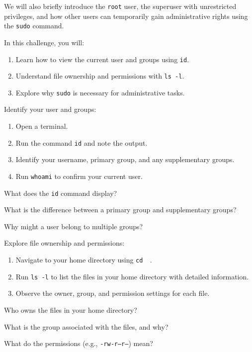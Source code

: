 \begin{challenge}
\begin{chadescription}
        We will also briefly introduce the \texttt{root} user, the superuser with unrestricted privileges, and how other users can temporarily gain administrative rights using the \texttt{sudo} command.

        In this challenge, you will:
        \begin{enumerate}
            \item Learn how to view the current user and groups using \texttt{id}.
            \item Understand file ownership and permissions with \texttt{ls -l}.
            \item Explore why \texttt{sudo} is necessary for administrative tasks.
        \end{enumerate}
    \end{chadescription}

    \begin{task}
    Identify your user and groups:
    \begin{enumerate}
        \item Open a terminal.
        \item Run the command \texttt{id} and note the output.
        \item Identify your username, primary group, and any supplementary groups.
        \item Run \texttt{whoami} to confirm your current user.
    \end{enumerate}
    \begin{questions}
        \item What does the \texttt{id} command display?
        \item What is the difference between a primary group and supplementary groups?
        \item Why might a user belong to multiple groups?
    \end{questions}
    \end{task}

    \begin{task}
    Explore file ownership and permissions:
    \begin{enumerate}
        \item Navigate to your home directory using \texttt{cd ~}.
        \item Run \texttt{ls -l} to list the files in your home directory with detailed information.
        \item Observe the owner, group, and permission settings for each file.
    \end{enumerate}
    \begin{questions}
        \item Who owns the files in your home directory?
        \item What is the group associated with the files, and why?
        \item What do the permissions (e.g., \texttt{-rw-r--r--}) mean?
    \end{questions}
    \end{task}


\end{challenge}
